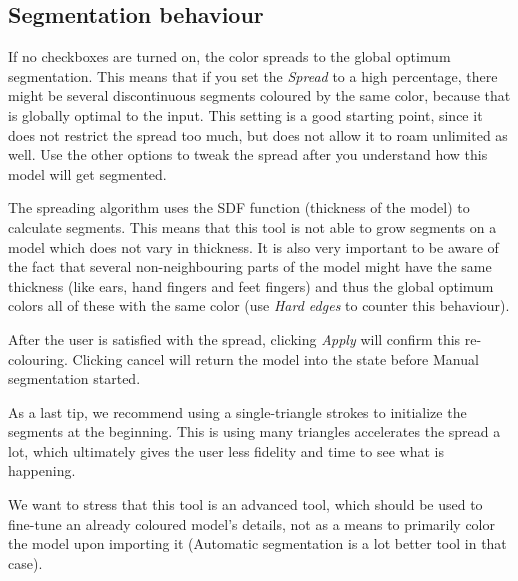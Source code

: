 \subsection{Segmentation behaviour}

If no checkboxes are turned on, the color spreads to the global optimum segmentation. This means that if you set the \textit{Spread} to a high percentage, there might be several discontinuous segments coloured by the same color, because that is globally optimal to the input. This setting is a good starting point, since it does not restrict the spread too much, but does not allow it to roam unlimited as well. Use the other options to tweak the spread after you understand how this model will get segmented.

The spreading algorithm uses the SDF function (thickness of the model) to calculate segments. This means that this tool is not able to grow segments on a model which does not vary in thickness. It is also very important to be aware of the fact that several non-neighbouring parts of the model might have the same thickness (like ears, hand fingers and feet fingers) and thus the global optimum colors all of these with the same color (use \textit{Hard edges} to counter this behaviour).

After the user is satisfied with the spread, clicking \textit{Apply} will confirm this re-colouring. Clicking cancel will return the model into the state before Manual segmentation started.

As a last tip, we recommend using a single-triangle strokes to initialize the segments at the beginning. This is using many triangles accelerates the spread a lot, which ultimately gives the user less fidelity and time to see what is happening.

We want to stress that this tool is an advanced tool, which should be used to fine-tune an already coloured model's details, not as a means to primarily color the model upon importing it (Automatic segmentation is a lot better tool in that case).